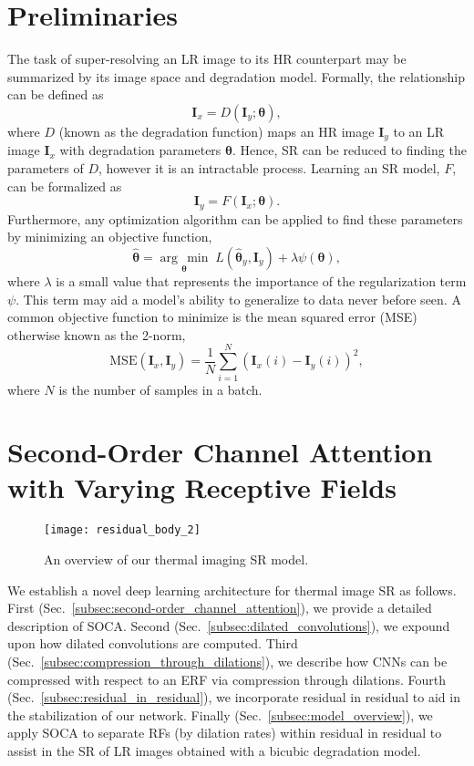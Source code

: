 \documentclass[runningheads]{llncs}
\newcommand{\argmin}[1]{\underset{#1}{\operatorname{arg}\,\operatorname{min}}\;}
\begin{document}
\section{Preliminaries}
\label{sec:preliminaries}
The task of super-resolving an LR image to its HR counterpart may be summarized
by its image space and degradation model. Formally, the relationship can be
defined as 
\begin{equation}
  \bm{I}_x = D(\bm{I}_y;\bm{\theta}),
\end{equation}
where $D$ (known as the degradation function) maps an HR image $\textbf{I}_y$ to
an LR image $\textbf{I}_x$ with degradation parameters $\bm{\theta}$. Hence, SR
can be reduced to finding the parameters of $D$, however it is an intractable
process. Learning an SR model, $F$, can be formalized as 
\begin{equation}
  \bm{I}_y = F(\bm{I}_x;\bm{\theta}).
\end{equation}
Furthermore, any optimization algorithm can be applied to find these parameters
by minimizing an objective function,
\begin{equation}
  \hat{\bm{\theta}}= \argmin{\bm{\theta}} L(\hat{\bm{\theta}}_y,\bm{I}_y) + \lambda\psi(\bm{\theta}),
\end{equation}
where $\lambda$ is a small value that represents the importance of the
regularization term $\psi$. This term may aid a model's ability to generalize to
data never before seen. A common objective function to minimize is the mean
squared error (MSE) otherwise known as the 2-norm,
\begin{equation}
  \text{MSE}(\bm{I}_x,\bm{I}_y) =\frac{1}{N} \sum\limits_{i = 1}^{N}(\bm{I}_x(i) - \bm{I}_y(i))^2,
\end{equation}
where $N$ is the number of samples in a batch. 
 
\section{Second-Order Channel Attention with Varying Receptive Fields}
\label{sec:second-order_channel_attention_with_varying_receptive_fields}
\begin{figure}
\centering
\texttt{[image: residual\_body\_2]}
\caption{An overview of our thermal imaging SR model.}
\label{fig:residual_body_2}
\end{figure}
We establish a novel deep learning architecture for thermal image SR as
follows. First (Sec.~\ref{subsec:second-order_channel_attention}), we provide a
detailed description of SOCA. Second (Sec.~\ref{subsec:dilated_convolutions}),
we expound upon how dilated convolutions are computed. Third
(Sec.~\ref{subsec:compression_through_dilations}), we describe how CNNs can be
compressed with respect to an ERF via compression through dilations. Fourth
(Sec.~\ref{subsec:residual_in_residual}), we incorporate residual in residual to
aid in the stabilization of our network. Finally
(Sec.~\ref{subsec:model_overview}), we apply SOCA to separate RFs (by dilation
rates) within residual in residual to assist in the SR of LR images obtained
with a bicubic degradation model. 
\end{document}

